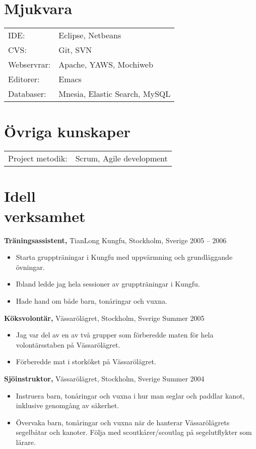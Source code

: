 \documentclass[margin]{res}
\begin{document}
\begin{resume}
\section{Mjukvara}
\begin{tabular}{l p{3in}}
	IDE: & Eclipse, Netbeans \\
	CVS: & Git, SVN \\
	Webservrar: & Apache, YAWS, Mochiweb \\
	Editorer: & Emacs \\
	Databaser: & Mnesia, Elastic Search, MySQL
\end{tabular}

\section{Övriga kunskaper}
\begin{tabular}{l p{3in}}
	Project metodik: & Scrum, Agile development
\end{tabular}

\section{Idell \\ verksamhet}
{\bf Träningsassistent,} TianLong Kungfu, Stockholm, Sverige \hfill 2005 -- 2006
\begin{itemize} \itemsep -2pt
\item Starta gruppträningar i Kungfu med uppvärmning och grundläggande övningar.
\item Ibland ledde jag hela sessioner av gruppträningar i Kungfu.
\item Hade hand om både barn, tonåringar och vuxna.
\end{itemize}

{\bf Köksvolontär,} Vässarölägret, Stockholm, Sverige \hfill Summer 2005
\begin{itemize} \itemsep -2pt
\item Jag var del av en av två grupper som förberedde maten för hela volontärsstaben på Vässarölägret.
\item Förberedde mat i storköket på Vässarölägret.
\end{itemize}

{\bf Sjöinstruktor,} Vässarölägret, Stockholm, Sverige \hfill Summer 2004
\begin{itemize} \itemsep -2pt
\item Instruera barn, tonåringar och vuxna i hur man seglar och paddlar kanot, inklusive genomgång av säkerhet.
\item Övervaka barn, tonåringar och vuxna när de hanterar Vässarölägrets segelbåtar och kanoter. Följa med scoutkårer/scoutlag på segelutflykter som lärare.
\end{itemize}


\end{resume}
\end{document}
